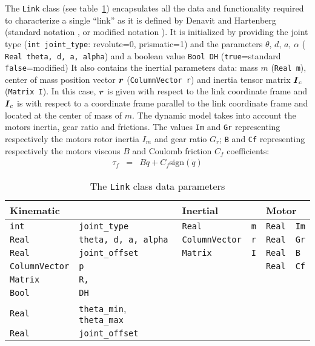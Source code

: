 \documentclass[11pt,fleqn,letterpaper]{report}
\newcommand{\mbold}[1]{\mbox{\boldmath $ #1 $}}
\begin{document}
The \texttt{Link} class (see table~\ref{tab:link}) encapsulates all
the data and functionality required to characterize a single ``link''
as it is defined by Denavit and Hartenberg (standard notation
\cite{Denavit55}, or modified notation \cite{craig}). It is initialized
by providing the joint type ({\tt int joint\_type}: revolute=0,
prismatic=1) and the parameters $\theta$, $d$, $a$, $\alpha$ ({\tt
  Real theta, d, a, alpha}) and a boolean value \texttt{Bool DH}
(\texttt{true}=standard \texttt{false}=modified) It also contains the
inertial parameters data: mass $m$ ({\tt Real m}), center of mass
position vector $\mbold{r}$ ({\tt ColumnVector r}) and inertia tensor
matrix $\mbold{I}_c$ ({\tt Matrix I}). In this case, $\mbold{r}$ is
given with respect to the link coordinate frame and $\mbold{I}_{c}$ is
with respect to a coordinate frame parallel to the link coordinate
frame and located at the center of mass of $m$.  The dynamic model
takes into account the motors inertia, gear ratio and frictions. The
values \texttt{Im} and \texttt{Gr} representing respectively the
motors rotor inertia $I_m$ and gear ratio $G_r$; \texttt{B} and
\texttt{Cf} representing respectively the motors viscous $B$ and
Coulomb friction $C_f$ coefficients:
  \begin{eqnarray*}
    \tau_{f}& = &  B \dot{q} + C_f \mbox{sign}(\dot{q})
  \end{eqnarray*}

\begin{table}[htbp]
  \caption{The \texttt{Link} class data parameters}
  \label{tab:link}
  \begin{center}
    \begin{tabular}{||ll|ll||ll||}
      \hline
      \hline
      \multicolumn{2}{||l|}{Kinematic} & \multicolumn{2}{l||}{Inertial} 
      & \multicolumn{2}{l||}{Motor} \\
      \hline
      \hline
      {\tt int} & {\tt joint\_type} & {\tt Real} & {\tt m} 
      & \texttt{Real} & \texttt{Im} \\
      {\tt Real} & {\tt theta, d, a, alpha} & {\tt ColumnVector} & {\tt r}
      & \texttt{Real} & \texttt{Gr} \\
      {\tt Real} & {\tt joint\_offset} & {\tt Matrix} & {\tt I}
      & \texttt{Real} & \texttt{B} \\
      {\tt ColumnVector} & {\tt p} & & & \texttt{Real} & \texttt{Cf} \\
      {\tt Matrix} & {\tt R,} & & & & \\
      \texttt{Bool} & \texttt{DH} & & & & \\
      \texttt{Real} & \texttt{theta\_min}, \texttt{theta\_max} & & & & \\
      \texttt{Real} & \texttt{joint\_offset} & & & & \\
      \hline
      \hline
    \end{tabular}
  \end{center}
\end{table}
\end{document}
